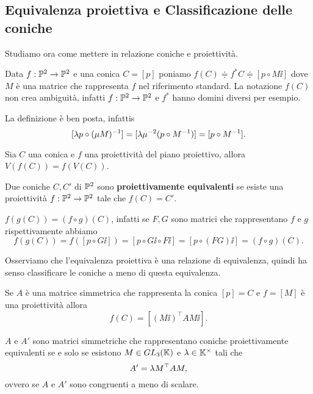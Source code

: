 \begin{multicols*}{2}
    \subsection{Equivalenza proiettiva e Classificazione delle coniche}
    Studiamo ora come mettere in relazione coniche e proiettivit\`a.

    \begin{definition}
    Data $f:\mathbb{P}^2\to\mathbb{P}^2$ e una conica $C=[p]$ poniamo $f(C)\doteqdot f^\ast C\doteqdot [p\circ M\ii]$ dove $M$ \`e una matrice che rappresenta $f$ nel riferimento standard. La notazione $f(C)$ non crea ambiguit\`a, infatti $f:\mathbb{P}^2\to\mathbb{P}^2$ e $f^\ast$ hanno domini diversi per esempio.
    \end{definition}
    \begin{remark}
    La definizione \`e ben posta, infattis
    \[[\lambda p\circ (\mu M)^{-1}]=[\lambda \mu^{-2}(p\circ M^{-1})]=[p\circ M^{-1}].\]
    \end{remark}

    \begin{proposition}
    Sia $C$ una conica e $f$ una proiettivit\`a del piano proiettivo, allora $V(f(C))=f(V(C))$.
    \end{proposition}

    \begin{definition}
    Due coniche $C,C'$ di $\mathbb{P}^2$ sono \textbf{proiettivamente equivalenti} se esiste una proiettivit\`a $f:\mathbb{P}^2\to\mathbb{P}^2$ tale che $f(C)=C'$.
    \end{definition}
    \begin{remark}
    $f(g(C))=(f\circ g)(C)$, infatti se $F, G$ sono matrici che rappresentano $f$ e $g$ rispettivamente abbiamo
    \[f(g(C))=f([p\circ G\ii])=[p\circ G\ii\circ F\ii]=[p\circ (FG)\ii]=(f\circ g)(C).\]
    \end{remark}

    Osserviamo che l'equivalenza proiettiva \`e una relazione di equivalenza, quindi ha senso classificare le coniche a meno di questa equivalenza.

    \begin{remark}
    Se $A$ \`e una matrice simmetrica che rappresenta la conica $[p]=C$ e $f=[M]$ \`e una proiettivit\`a allora
    \[f(C)=[(M\ii)^\top AM\ii].\]
    \end{remark}
    \begin{remark}
    $A$ e $A'$ sono matrici simmetriche che rappresentano coniche proiettivamente equivalenti se e solo se esistono $M\in \GL[3]\K$ e $\lambda\in \mathbb{K}^\times$ tali che
    \[A'=\lambda M^\top A M,\]
    ovvero se $A$ e $A'$ sono congruenti a meno di scalare.
    \end{remark}


\end{multicols*}
